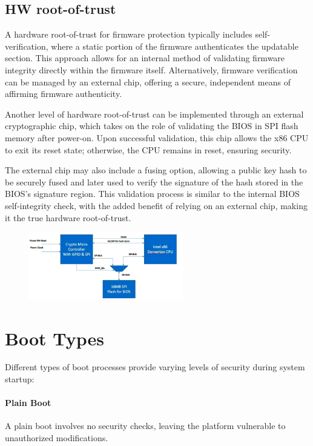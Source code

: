 \subsection{HW root-of-trust}

A hardware root-of-trust for firmware protection typically includes 
self-verification, where a static portion of the firmware authenticates 
the updatable section. This approach allows for an internal method 
of validating firmware integrity directly within the firmware itself. 
Alternatively, firmware verification can be managed by an external 
chip, offering a secure, independent means of affirming firmware 
authenticity.

Another level of hardware root-of-trust can be implemented through 
an external cryptographic chip, which takes on the role of validating 
the BIOS in SPI flash memory after power-on. Upon successful 
validation, this chip allows the x86 CPU to exit its reset state; 
otherwise, the CPU remains in reset, ensuring security.

The external chip may also include a fusing option, allowing a public 
key hash to be securely fused and later used to verify the signature 
of the hash stored in the BIOS's signature region. This validation 
process is similar to the internal BIOS self-integrity check, with the 
added benefit of relying on an external chip, making it the true 
hardware root-of-trust.

\begin{figure}[H]
  \centering
  \includegraphics[width=0.6\textwidth]{img/Hw RoT verification.png}
\end{figure}
\section{Boot Types}

Different types of boot processes provide varying levels of security 
during system startup:

\paragraph{Plain Boot} A plain boot involves no security checks, 
leaving the platform vulnerable to unauthorized modifications.

